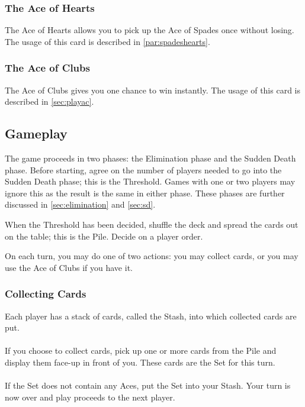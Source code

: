 \documentclass{article}
\begin{document}
\subsubsection{The Ace of Hearts}
The Ace of Hearts allows you to pick up the Ace of Spades once without
losing. The usage of this card is described in \ref{par:spadeshearts}.

\subsubsection{The Ace of Clubs}
The Ace of Clubs gives you one chance to win instantly. The usage of
this card is described in \ref{sec:playac}.

\subsection{Gameplay}

The game proceeds in two phases: the Elimination phase and the Sudden
Death phase. Before starting, agree on the number of players needed to
go into the Sudden Death phase; this is the Threshold. Games with one or
two players may ignore this as the result is the same in either phase.
These phases are further discussed in \ref{sec:elimination} and
\ref{sec:sd}.

When the Threshold has been decided, shuffle the deck and spread the
cards out on the table; this is the Pile. Decide on a player order.

On each turn, you may do one of two actions: you may collect cards, or
you may use the Ace of Clubs if you have it.

\subsubsection{Collecting Cards}
\label{sec:collecting}

Each player has a stack of cards, called the Stash, into which collected
cards are put.

\paragraph{}
If you choose to collect cards, pick up one or more cards from the Pile
and display them face-up in front of you. These cards are the Set for
this turn.

\paragraph{}
If the Set does not contain any Aces, put the Set into your Stash.
Your turn is now over and play proceeds to the next player. 
\end{document}
